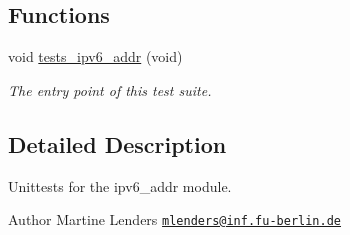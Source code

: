 \subsection*{Functions}
\begin{DoxyCompactItemize}
\item 
void \hyperlink{group__unittests_gaa968d7cf1c200e4ec0394693683d8260}{tests\+\_\+ipv6\+\_\+addr} (void)
\begin{DoxyCompactList}\small\item\em The entry point of this test suite. \end{DoxyCompactList}\end{DoxyCompactItemize}


\subsection{Detailed Description}
Unittests for the {\ttfamily ipv6\+\_\+addr} module. 

\begin{DoxyAuthor}{Author}
Martine Lenders \href{mailto:mlenders@inf.fu-berlin.de}{\tt mlenders@inf.\+fu-\/berlin.\+de} 
\end{DoxyAuthor}
